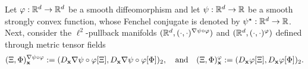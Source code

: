 \begin{proposition}
    \label{thm:pull-back-mappings}
        Let $\varphi:\mathbb{R}^d \to \mathbb{R}^d$ be a smooth diffeomorphism and let $\psi: \mathbb{R}^d \to \mathbb{R}$ be a smooth strongly convex function, whose Fenchel conjugate is denoted by $\psi^\star: \mathbb{R}^d\to\mathbb{R}$. Next, consider the $\ell^2$-pullback manifolds $(\mathbb{R}^d, (\cdot,\cdot)^{\nabla \psi \circ \varphi})$ and $(\mathbb{R}^d, (\cdot,\cdot)^{\varphi})$ defined through metric tensor fields
        \begin{equation}
            (\Xi, \Phi)^{\nabla \psi \circ \varphi}_{\mathbf{x}} := (D_{\mathbf{x}} \nabla \psi \circ \varphi[\Xi], D_{\mathbf{x}} \nabla \psi \circ \varphi[\Phi])_2, \quad \text{and} \quad (\Xi, \Phi)^{\varphi}_{\mathbf{x}} := (D_{\mathbf{x}} \varphi[\Xi], D_{\mathbf{x}} \varphi[\Phi])_2.
        \end{equation}
    

\end{proposition}
